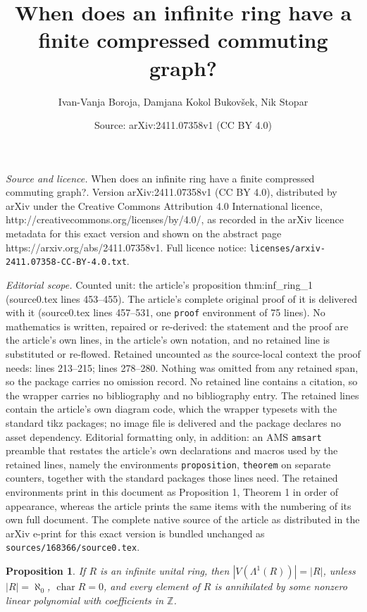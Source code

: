\documentclass[10pt,a4paper]{amsart}
\title{When does an infinite ring have a finite compressed commuting graph?}
\author{Ivan-Vanja Boroja, Damjana Kokol Bukov\v{s}ek, Nik Stopar}
\date{Source: arXiv:2411.07358v1 (CC BY 4.0)}
\newtheorem{proposition}{Proposition}
\newcommand{\Z}{\mathbb{Z}}
\DeclareMathOperator{\ch}{char}
\begin{document}
\maketitle

\noindent\emph{Source and licence.} When does an infinite ring have a finite compressed commuting graph?. Version arXiv:2411.07358v1 (CC BY 4.0), distributed by arXiv under the Creative Commons Attribution 4.0 International licence, http://creativecommons.org/licenses/by/4.0/, as recorded in the arXiv licence metadata for this exact version and shown on the abstract page https://arxiv.org/abs/2411.07358v1. Full licence notice: \texttt{licenses/arxiv-2411.07358-CC-BY-4.0.txt}.\par\smallskip

\noindent\textit{Editorial scope.} Counted unit: the article's proposition thm:inf\_ring\_1 (source0.tex lines 453--455). The article's complete original proof of it is delivered with it (source0.tex lines 457--531, one \texttt{proof} environment of 75 lines). No mathematics is written, repaired or re-derived: the statement and the proof are the article's own lines, in the article's own notation, and no retained line is substituted or re-flowed.  Retained uncounted as the source-local context the proof needs: lines 213--215; lines 278--280.  Nothing was omitted from any retained span, so the package carries no omission record.  No retained line contains a citation, so the wrapper carries no bibliography and no bibliography entry.  The retained lines contain the article's own diagram code, which the wrapper typesets with the standard tikz packages; no image file is delivered and the package declares no asset dependency.  Editorial formatting only, in addition: an AMS \texttt{amsart} preamble that restates the article's own declarations and macros used by the retained lines, namely the environments \texttt{proposition}, \texttt{theorem} on separate counters, together with the standard packages those lines need.  The retained environments print in this document as Proposition 1, Theorem 1 in order of appearance, whereas the article prints the same items with the numbering of its own full document.  The complete native source of the article as distributed in the arXiv e-print for this exact version is bundled unchanged as \texttt{sources/168366/source0.tex}.
\begin{proposition}\label{prop:inf_ring_1}
    If $R$ is an infinite unital ring, then $|V(\Lambda^1(R))|=|R|$, unless $|R|=\aleph_0$,  $\ch R = 0$, and every element of $R$ is annihilated by some nonzero linear polynomial with coefficients in $\Z$.
\end{proposition}
\end{document}
